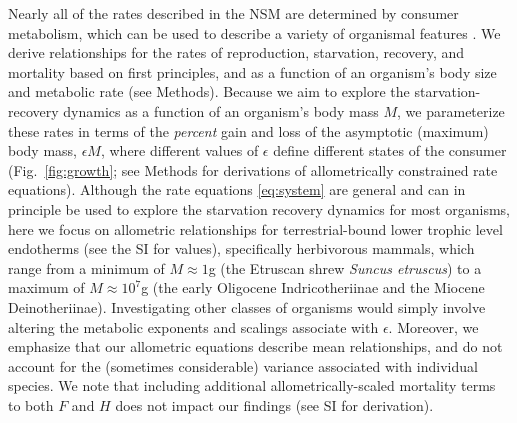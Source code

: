 \documentclass[twocolumn,preprintnumbers,amsmath,amssymb,superscriptaddress]{revtex4}
\begin{document}
Nearly all of the rates described in the NSM are determined by consumer
metabolism, which can be used to describe a variety of organismal features
\citep{Brown:2004wq}.
We derive relationships for the rates of reproduction, starvation, recovery, and mortality based on first principles, and as a function of an organism's body size and metabolic rate (see Methods).
Because we aim to explore the starvation-recovery dynamics as a function of an organism's body mass $M$, we parameterize these rates in terms of the \emph{percent} gain and loss of the asymptotic (maximum) body mass, $\epsilon M$, where different values of $\epsilon$ define different states of the consumer (Fig.~\ref{fig:growth}; see Methods for derivations of allometrically constrained rate equations).
Although the rate equations \eqref{eq:system} are general and can in
principle be used to explore the starvation recovery dynamics for most
organisms, here we focus on allometric relationships for terrestrial-bound
lower trophic level endotherms (see the SI for values), specifically herbivorous mammals, which range from a minimum of $M\approx1$g (the Etruscan shrew \emph{Suncus etruscus}) to a maximum of $M\approx10^7$g (the early Oligocene Indricotheriinae and the Miocene Deinotheriinae).
Investigating other classes of organisms would simply involve altering the metabolic exponents and scalings associate with $\epsilon$. Moreover, we emphasize that our allometric equations describe mean relationships, and do not account for the (sometimes considerable) variance associated with individual species.
{\color{red} We note that including additional allometrically-scaled mortality terms to both $F$ and $H$ does not impact our findings (see SI for derivation).}

\end{document}
